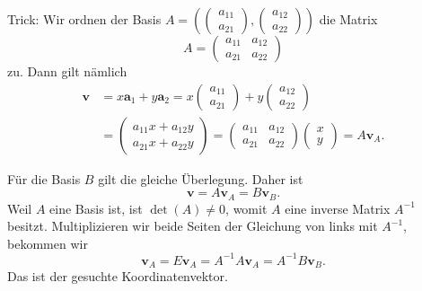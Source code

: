 \documentclass[9pt]{beamer}
\newcommand{\bv}[1]{\mathbf{#1}}
\begin{document}
\begin{frame}[t]
\vspace{4em}
Trick: Wir ordnen der Basis
$A=(\begin{pmatrix}a_{11}\\ a_{21}\end{pmatrix},
\begin{pmatrix}a_{12}\\ a_{22}\end{pmatrix})$
die Matrix
\[A=\begin{pmatrix}a_{11} & a_{12}\\ a_{21} & a_{22}\end{pmatrix}\]
zu.\pause{} Dann gilt nämlich
\begin{align*}
\bv v &= x\bv a_1 + y\bv a_2 = x\begin{pmatrix}a_{11}\\ a_{21}\end{pmatrix}
+ y\begin{pmatrix}a_{12}\\ a_{22}\end{pmatrix}\\
&= \begin{pmatrix}a_{11}x + a_{12}y\\ a_{21}x + a_{22}y\end{pmatrix}
= \begin{pmatrix}a_{11} & a_{12}\\ a_{21} & a_{22}\end{pmatrix}\begin{pmatrix}x\\ y\end{pmatrix}
= A\bv v_A.
\end{align*}
\end{frame}

\begin{frame}
Für die Basis $B$ gilt die gleiche Überlegung. Daher ist
\[\bv v = A\bv v_A = B\bv v_B.\]\pause
Weil $A$ eine Basis ist, ist $\det(A)\ne 0$, womit $A$ eine
inverse Matrix $A^{-1}$ besitzt. Multiplizieren wir beide Seiten
der Gleichung von links mit $A^{-1}$, bekommen wir
\[\bv v_A = E\bv v_A = A^{-1}A\bv v_A = A^{-1}B\bv v_B.\]
Das ist der gesuchte Koordinatenvektor.
\end{frame}
\end{document}
